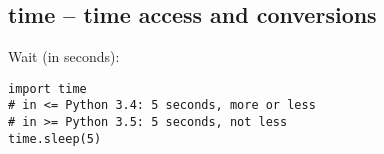 \subsection{time -- time access and conversions}
Wait (in seconds):
\begin{verbatim}
import time
# in <= Python 3.4: 5 seconds, more or less
# in >= Python 3.5: 5 seconds, not less
time.sleep(5)
\end{verbatim}

%